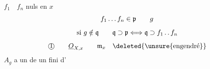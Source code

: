 $f_1\quad f_n$ nuls en $x$
\[
f_1 \mathinner{\ldotp\ldotp\ldotp} f_n\in\mathfrak p\qquad g
\]
\[
\text{si } g\notin\mathfrak q \qquad \mathfrak q\supset\mathfrak p \Longleftrightarrow
\mathfrak q\supset f_1\mathinner{\ldotp\ldotp} f_n
\]
\[
\text{\textcircled{1}}\qquad \underline{O}_{X,x}\qquad
\mathfrak m_x\quad\deleted{\unsure{\text{engendré}}}
\]
$A_g$ a un  de \qquad
{}   un  fini d'

